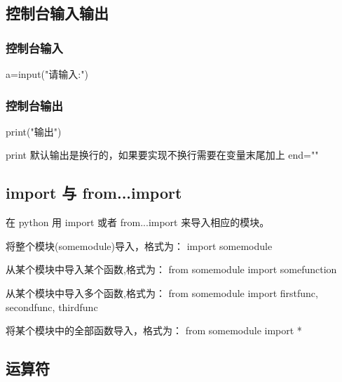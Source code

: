 \documentclass{article}
\begin{document}
\subsection{控制台输入输出}
\subsubsection{控制台输入}
a=input("请输入:")
\subsubsection{控制台输出}
print("输出")

print 默认输出是换行的，如果要实现不换行需要在变量末尾加上 end=""


\subsection{import 与 from...import}
在 python 用 import 或者 from...import 来导入相应的模块。

将整个模块(somemodule)导入，格式为： import somemodule

从某个模块中导入某个函数,格式为： from somemodule import somefunction

从某个模块中导入多个函数,格式为： from somemodule import firstfunc, secondfunc, thirdfunc

将某个模块中的全部函数导入，格式为： from somemodule import *

\subsection{运算符}
\end{document}
